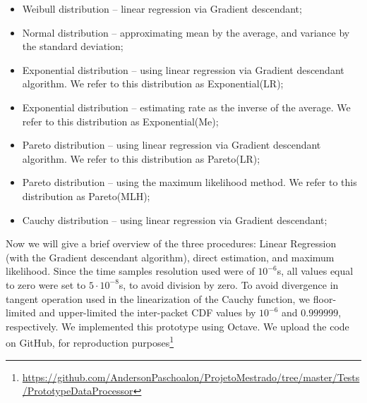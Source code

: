 \begin{itemize}
    \item Weibull distribution --  linear regression via Gradient descendant;
    \item Normal distribution -- approximating  mean by the average, and variance by the standard deviation;
    \item Exponential distribution --  using linear regression via Gradient descendant algorithm. We refer to this distribution as Exponential(LR);
    \item Exponential distribution -- estimating rate as the inverse of the average. We refer to this distribution as Exponential(Me);
    \item Pareto distribution -- using linear regression via Gradient descendant algorithm. We refer to this distribution as Pareto(LR);
    \item Pareto distribution -- using the maximum likelihood method. We refer to this distribution as Pareto(MLH);
    \item Cauchy distribution -- using linear regression via Gradient descendant;
\end{itemize}



Now we will give a brief overview of the three procedures: Linear Regression (with the  Gradient descendant algorithm), direct estimation, and maximum likelihood. Since the time samples resolution used were of $10^{-6}$s, all values equal to zero were set to  $5\cdot10^{-8}$s, to avoid division by zero. To avoid divergence in tangent operation used in the linearization of the Cauchy function, we floor-limited and upper-limited the inter-packet CDF  values by  $10^{-6}$ and $0.999999$, respectively. We implemented this prototype using Octave. We upload the code on GitHub, for reproduction purposes\footnote{\href{https://github.com/AndersonPaschoalon/ProjetoMestrado/tree/master/Tests/PrototypeDataProcessor}{https://github.com/AndersonPaschoalon/ProjetoMestrado/tree/master/Tests/PrototypeDataProcessor}}

